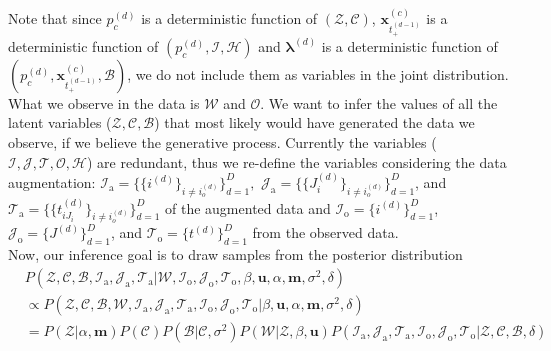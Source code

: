 \documentclass[a4paper]{article}
\begin{document}
	  Note that since $p_c^{(d)}$ is a deterministic function of $(\mathcal{Z}, \mathcal{C})$, $\boldsymbol{x}_{t_+^{(d-1)}}^{(c)}$ is a deterministic function of $(p_c^{(d)}, \mathcal{I}, \mathcal{H})$  and $\boldsymbol{\lambda}^{(d)}$ is a deterministic function of $(p_c^{(d)}, \boldsymbol{x}_{t_+^{(d-1)}}^{(c)}, \mathcal{B})$, we do not include them as variables in the joint distribution. \\ \newline
	 What we observe in the data is $\mathcal{W}$ and $\mathcal{O}$. We want to infer the values of all the latent variables ($\mathcal{Z}, \mathcal{C}, \mathcal{B}$) that most likely would have generated the data we observe, if we believe the generative process. Currently the variables ($\mathcal{I},\mathcal{J}, \mathcal{T}, \mathcal{O}, \mathcal{H}$) are redundant, thus we re-define the variables considering the data augmentation:  $\mathcal{I}_{\mbox{a}}=\{\{i^{(d)}\}_{i\neq i_o^{(d)}}\}_{d=1}^D,$  $\mathcal{J}_{\mbox{a}}=\{\{J_i^{(d)}\}_{i\neq i_o^{(d)}}\}_{d=1}^D$, and $\mathcal{T}_{\mbox{a}}=\{\{t_{iJ_i}^{(d)}\}_{i\neq i_o^{(d)}}\}_{d=1}^D$ of the augmented data and $\mathcal{I}_{\mbox{o}}=\{i^{(d)}\}_{d=1}^D$,  $\mathcal{J}_{\mbox{o}}=\{J^{(d)}\}_{d=1}^D$, and $\mathcal{T}_{\mbox{o}}= \{t^{(d)}\}_{d=1}^D$ from the observed data.\\ \newline
	  Now, our inference goal is to draw samples from the posterior distribution
	  \begin{equation}
	  \begin{aligned}
	  &P(\mathcal{Z}, \mathcal{C}, \mathcal{B}, \mathcal{I}_{\mbox{a}}, \mathcal{J}_{\mbox{a}}, \mathcal{T}_{\mbox{a}}|\mathcal{W}, \mathcal{I}_{\mbox{o}}, \mathcal{J}_{\mbox{o}}, \mathcal{T}_{\mbox{o}}, \beta, \boldsymbol{u}, \alpha, \boldsymbol{m}, \sigma^2,  \delta) \\
	  &\propto 	P(\mathcal{Z}, \mathcal{C}, \mathcal{B}, \mathcal{W}, \mathcal{I}_{\mbox{a}}, \mathcal{J}_{\mbox{a}}, \mathcal{T}_{\mbox{a}},\mathcal{I}_{\mbox{o}}, \mathcal{J}_{\mbox{o}}, \mathcal{T}_{\mbox{o}} |\beta, \boldsymbol{u}, \alpha, \boldsymbol{m}, \sigma^2, \delta)\\&  = P(\mathcal{Z}|\alpha, \boldsymbol{m})P(\mathcal{C})P(\mathcal{B}|\mathcal{C}, \sigma^2)P(\mathcal{W}|\mathcal{Z}, \beta, \boldsymbol{u})P(\mathcal{I}_{\mbox{a}}, \mathcal{J}_{\mbox{a}}, \mathcal{T}_{\mbox{a}},\mathcal{I}_{\mbox{o}}, \mathcal{J}_{\mbox{o}}, \mathcal{T}_{\mbox{o}} |\mathcal{Z}, \mathcal{C}, \mathcal{B}, \delta)
	  \end{aligned}
	  \end{equation}
\end{document}
